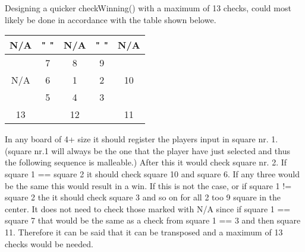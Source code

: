 \documentclass[a4paper,10pt]{article}
\begin{document}
	Designing a quicker checkWinning() with a maximum of 13 checks, could most likely be done in accordance with the table shown belowe.   
	
	\centering
	\begin{tabular}{|c|c|c|c|c|}
		\hline 
		N/A &"    "& N/A &"    "& N/A \\ 
		\hline 
		& 7 & 8 & 9 &   \\ 
		\hline 
		N/A & 6 & 1 & 2 & 10 \\ 
		\hline 
		& 5 & 4 & 3 &  \\ 
		\hline 
		13 &    & 12 &    & 11 \\ 
		\hline 
	\end{tabular} 
	
	
	\flushleft
	
	In any board of 4+ size it should register the players input in square nr. 1. (square nr.1 will always be the one that the player have just selected and thus the following sequence is malleable.) After this it would check square nr. 2. If square 1 == square 2 it should check square 10 and square 6. If any three would be the same this would result in a win. If this is not the case, or if square 1 != square 2 the it should check square 3 and so on for all 2 too 9 square in the center. It does not need to check those marked with N/A since if  square 1 == square 7 that would be the same as a check from square 1 == 3 and then square 11. Therefore it can be said that it can be transposed and a maximum of 13 checks would be needed.  
	
	
	\begin{comment}
	Hvis Fern Time er lavet tilføjes det her og begin og end comment skal fjernes. 
	\textbf{Fern program}
	
	
	\end{comment}
	
\end{document}
